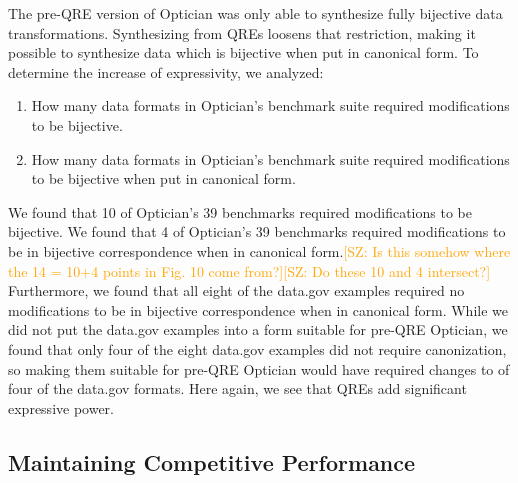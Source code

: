 \documentclass[acmsmall,review,anonymous]{acmart}
\newcommand{\FINISH}[3]{\ifdraft\textcolor{#1}{[#2: #3]}\fi}
\newcommand{\saz}[1]{\FINISH{orange}{SZ}{#1}}
\begin{document}
The pre-QRE version of Optician was only able to synthesize fully bijective data
transformations.  Synthesizing from QREs loosens that restriction, making it
possible to synthesize data which is bijective when put in canonical form. To
determine the increase of expressivity, we analyzed:
\begin{enumerate}
  \item How many data formats in Optician's benchmark suite required modifications
  to be bijective.
  \item How many data formats in Optician's benchmark suite required modifications
  to be bijective when put in canonical form.
\end{enumerate}

We found that 10 of Optician's 39 benchmarks required modifications to be
bijective. We found that 4 of Optician's 39 benchmarks required modifications to
be in bijective correspondence when in canonical form.\saz{Is this somehow where
  the 14 = 10+4 points in Fig. 10 come from?}\saz{Do these 10 and 4 intersect?}
Furthermore, we found that all eight of the data.gov examples required no
modifications to be in bijective correspondence when in canonical form. While we
did not put the data.gov examples into a form suitable for pre-QRE Optician, we
found that only four of the eight data.gov examples did not require
canonization, so making them suitable for pre-QRE Optician would have required 
changes to of four of the data.gov formats.  Here again, we see that QREs add
significant expressive power.

\subsection{Maintaining Competitive Performance}
\end{document}
